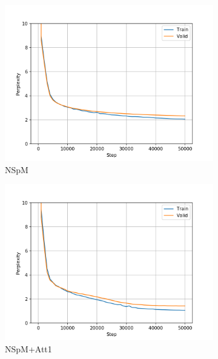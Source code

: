 \begin{figure}[h]
\centering
\begin{subfigure}{0.3\textwidth}
\includegraphics[width=\textwidth]{../results/dbnqa1/run1/neural_sparql_machine/ppls.png} 
\caption{NSpM}
\label{fig:dbnqa nsm ppl}
\end{subfigure}
\hfill
\begin{subfigure}{0.3\textwidth}
\includegraphics[width=\textwidth]{../results/dbnqa1/run1/neural_sparql_machine_bahdanau_attention/ppls.png}
\caption{NSpM+Att1}
\label{fig:dbnqa nsm-bah ppl}
\end{subfigure}
\hfill
\begin{subfigure}{0.3\textwidth}

\end{subfigure}
\end{figure}
